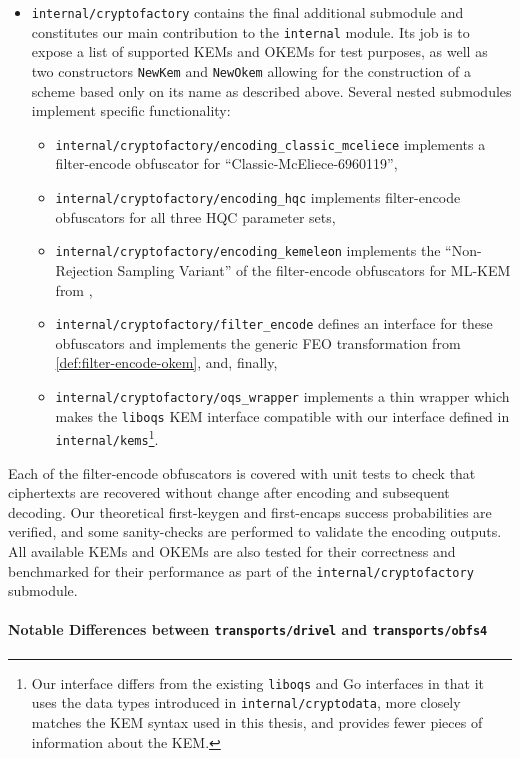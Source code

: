 \begin{itemize}
    \item \texttt{internal/cryptofactory} contains the final additional submodule and constitutes our main contribution to the \texttt{internal} module. Its job is to expose a list of supported KEMs and OKEMs for test purposes, as well as two constructors \texttt{NewKem} and \texttt{NewOkem} allowing for the construction of a scheme based only on its name as described above. Several nested submodules implement specific functionality:
    \begin{itemize}
        \item \texttt{internal/cryptofactory/encoding\_classic\_mceliece} implements a filter-encode obfuscator for ``Classic-McEliece-6960119'',
        \item \texttt{internal/cryptofactory/encoding\_hqc} implements filter-encode obfuscators for all three HQC parameter sets,
        \item \texttt{internal/cryptofactory/encoding\_kemeleon} implements the ``Non-Rejection Sampling Variant'' of the filter-encode obfuscators for ML-KEM from \cite{irtf-cfrg-kemeleon-00},
        \item \texttt{internal/cryptofactory/filter\_encode} defines an interface for these obfuscators and implements the generic FEO transformation from \cref{def:filter-encode-okem}, and, finally,
        \item \texttt{internal/cryptofactory/oqs\_wrapper} implements a thin wrapper which makes the \texttt{liboqs} KEM interface compatible with our interface defined in \texttt{internal/kems}\footnote{Our interface differs from the existing \texttt{liboqs} and Go interfaces in that it uses the data types introduced in \texttt{internal/cryptodata}, more closely matches the KEM syntax used in this thesis, and provides fewer pieces of information about the KEM.}.
    \end{itemize}
\end{itemize}

Each of the filter-encode obfuscators is covered with unit tests to check that ciphertexts are recovered without change after encoding and subsequent decoding. Our theoretical first-keygen and first-encaps success probabilities are verified, and some sanity-checks are performed to validate the encoding outputs. All available KEMs and OKEMs are also tested for their correctness and benchmarked for their performance as part of the \texttt{internal/cryptofactory} submodule.

\paragraph{Notable Differences between \texttt{transports/drivel} and \texttt{transports/obfs4}}

